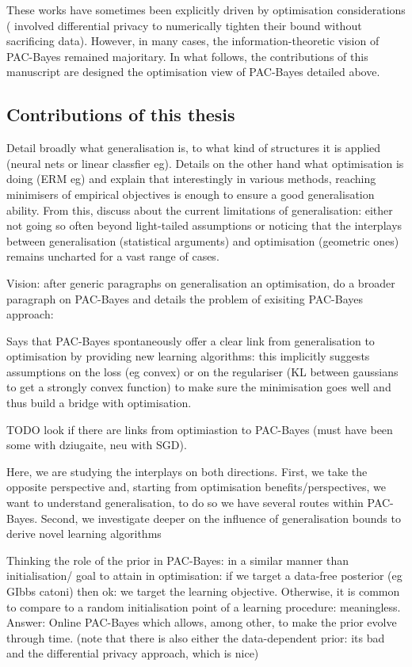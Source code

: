 These works have sometimes been explicitly driven by optimisation considerations (\citealp{dziugaite2018data} involved differential privacy to numerically tighten their bound without sacrificing data). However, in many cases, the information-theoretic vision of PAC-Bayes remained majoritary. In what follows, the contributions of this manuscript are designed \wrt the optimisation view of PAC-Bayes detailed above. 

\subsection{Contributions of this thesis}

 

\newpage
Detail broadly what generalisation is, to what kind of structures it is applied (neural nets or linear classfier eg). Details on the other hand what optimisation is doing (ERM eg) and explain that interestingly in various methods, reaching minimisers of empirical objectives is enough to ensure a good generalisation ability. From this, discuss about the current limitations of generalisation: either not going so often beyond light-tailed assumptions or noticing that the interplays between generalisation (statistical arguments) and optimisation (geometric ones) remains uncharted for a vast range of cases.

Vision: after generic paragraphs on generalisation an optimisation, do a broader paragraph on PAC-Bayes and details the problem of exisiting PAC-Bayes approach: 

Says that PAC-Bayes spontaneously offer a clear link from generalisation to optimisation by providing new learning algorithms: this implicitly suggests assumptions on the loss (eg convex) or on the regulariser (KL between gaussians to get a strongly convex function) to make sure the minimisation goes well and thus build a bridge with optimisation.

TODO look if there are links from optimiastion to PAC-Bayes (must have been some with dziugaite, neu with SGD).

Here, we are studying the interplays on both directions. First, we take the opposite perspective and, starting from optimisation benefits/perspectives, we want to understand generalisation, to do so we have several routes within PAC-Bayes. Second, we investigate deeper on the influence of generalisation bounds to derive novel learning algorithms

Thinking the role of the prior in PAC-Bayes: in a similar manner than initialisation/ goal to attain in optimisation: if we target a data-free posterior (eg GIbbs catoni) then ok: we target the learning objective. Otherwise, it is common to compare to a random initialisation point of a learning procedure: meaningless. Answer: Online PAC-Bayes which allows, among other, to make the prior evolve through time. (note that there is also either the data-dependent prior: its bad and the differential privacy approach, which is nice)


